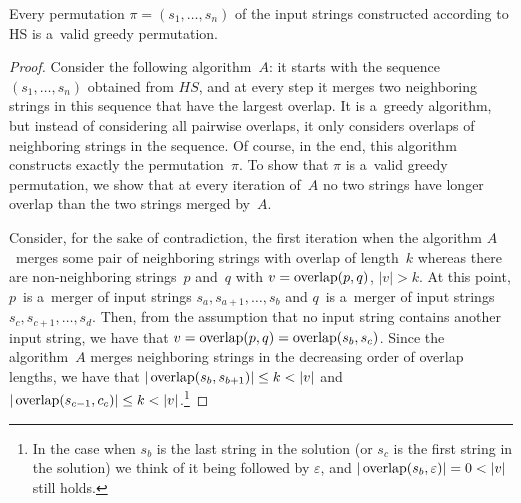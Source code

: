 \begin{theorem}
\label{thm:gr_im_wghc}
Every permutation $\pi=(s_1, \dots, s_n)$ of the input strings constructed according to HS is a~valid greedy permutation.
\end{theorem}
\begin{proof}
Consider the following algorithm~$A$: it starts with the sequence $(s_1, \dots, s_n)$ obtained from $HS$, and at every step it merges two neighboring strings in this sequence that have the largest overlap. It is a~greedy algorithm, but instead of considering all pairwise overlaps, it only considers overlaps of neighboring strings in the sequence. Of course, in the end, this algorithm constructs exactly the permutation~$\pi$. To show that $\pi$ is a~valid greedy permutation, we show that at every iteration of~$A$ no two strings have longer overlap than the two strings merged by~$A$.

Consider, for the sake of contradiction, the first iteration when the algorithm $A$~merges some pair of neighboring strings with overlap of length~$k$ whereas there are non-neighboring strings~$p$ and~$q$ with $v=\operatorname{overlap}(p,q)$, $|v|>k$. 
At this point, $p$~is a~merger of input strings $s_a, s_{a+1}, \dotsc, s_b$
and $q$~is a~merger of input strings $s_c, s_{c+1}, \dotsc, s_d$. 
Then, from the assumption that no input string contains another input string, we have that $v=\operatorname{overlap}(p,q)=\operatorname{overlap}(s_b,s_c)$. Since the algorithm~$A$
merges neighboring strings in the decreasing order of overlap lengths, we have that $|\overlap(s_b,s_{b+1})| \le k <|v|$ and $|\operatorname{overlap}(s_{c-1},c_c)| \le k < |v|$.\footnote{In the case when $s_b$ is the last string in the solution (or $s_c$ is the first string in the solution) we think of it being followed by $\varepsilon$, and $|\overlap(s_b,\varepsilon)|=0<|v|$ still holds.} 


\end{proof}
